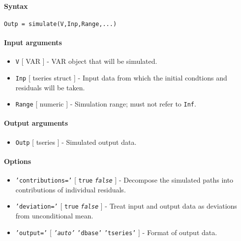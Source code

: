 


	\paragraph{Syntax}

\begin{verbatim}
Outp = simulate(V,Inp,Range,...)
\end{verbatim}

\paragraph{Input arguments}

\begin{itemize}
\item
  \texttt{V} {[} VAR {]} - VAR object that will be simulated.
\item
  \texttt{Inp} {[} tseries \textbar{} struct {]} - Input data from which
  the initial condtions and residuals will be taken.
\item
  \texttt{Range} {[} numeric {]} - Simulation range; must not refer to
  \texttt{Inf}.
\end{itemize}

\paragraph{Output arguments}

\begin{itemize}
\itemsep1pt\parskip0pt
\item
  \texttt{Outp} {[} tseries {]} - Simulated output data.
\end{itemize}

\paragraph{Options}

\begin{itemize}
\item
  \texttt{'contributions='} {[} \texttt{true} \textbar{}
  \emph{\texttt{false}} {]} - Decompose the simulated paths into
  contributions of individual residuals.
\item
  \texttt{'deviation='} {[} \texttt{true} \textbar{}
  \emph{\texttt{false}} {]} - Treat input and output data as deviations
  from unconditional mean.
\item
  \texttt{'output='} {[} \emph{\texttt{'auto'}} \textbar{}
  \texttt{'dbase'} \textbar{} \texttt{'tseries'} {]} - Format of output
  data.
\end{itemize}

